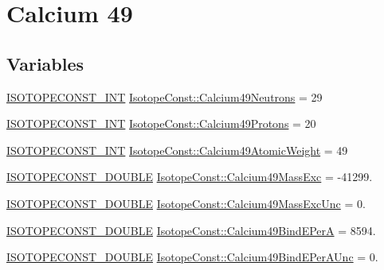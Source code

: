 \hypertarget{group___isotope_const-_calcium-_ca49}{}\section{Calcium 49}
\label{group___isotope_const-_calcium-_ca49}
\subsection*{Variables}
\begin{DoxyCompactItemize}
\item 
\mbox{\hyperlink{group___isotope_const-_macros_ga5f18360b3e99483a35c32d789e62621c}{I\+S\+O\+T\+O\+P\+E\+C\+O\+N\+S\+T\+\_\+\+I\+NT}} \mbox{\hyperlink{group___isotope_const-_calcium-_ca49_ga1460ac1f0fcb5cb558f46b4c9f1b8f87}{Isotope\+Const\+::\+Calcium49\+Neutrons}} = 29
\item 
\mbox{\hyperlink{group___isotope_const-_macros_ga5f18360b3e99483a35c32d789e62621c}{I\+S\+O\+T\+O\+P\+E\+C\+O\+N\+S\+T\+\_\+\+I\+NT}} \mbox{\hyperlink{group___isotope_const-_calcium-_ca49_gacabbec065ac66148f8aea344dbf8311b}{Isotope\+Const\+::\+Calcium49\+Protons}} = 20
\item 
\mbox{\hyperlink{group___isotope_const-_macros_ga5f18360b3e99483a35c32d789e62621c}{I\+S\+O\+T\+O\+P\+E\+C\+O\+N\+S\+T\+\_\+\+I\+NT}} \mbox{\hyperlink{group___isotope_const-_calcium-_ca49_gadb551dc804acf3b73c1dd6917e12c258}{Isotope\+Const\+::\+Calcium49\+Atomic\+Weight}} = 49
\item 
\mbox{\hyperlink{group___isotope_const-_macros_ga8f45a7272ce02c0b4c65c44636ed719a}{I\+S\+O\+T\+O\+P\+E\+C\+O\+N\+S\+T\+\_\+\+D\+O\+U\+B\+LE}} \mbox{\hyperlink{group___isotope_const-_calcium-_ca49_gac6f33ffee9a0ea4d837d079af5b2c681}{Isotope\+Const\+::\+Calcium49\+Mass\+Exc}} = -\/41299.
\item 
\mbox{\hyperlink{group___isotope_const-_macros_ga8f45a7272ce02c0b4c65c44636ed719a}{I\+S\+O\+T\+O\+P\+E\+C\+O\+N\+S\+T\+\_\+\+D\+O\+U\+B\+LE}} \mbox{\hyperlink{group___isotope_const-_calcium-_ca49_ga5c7730e934c7930a86443cda814409ca}{Isotope\+Const\+::\+Calcium49\+Mass\+Exc\+Unc}} = 0.
\item 
\mbox{\hyperlink{group___isotope_const-_macros_ga8f45a7272ce02c0b4c65c44636ed719a}{I\+S\+O\+T\+O\+P\+E\+C\+O\+N\+S\+T\+\_\+\+D\+O\+U\+B\+LE}} \mbox{\hyperlink{group___isotope_const-_calcium-_ca49_ga15442ccaa0f0121c7ca07ca22eda94ec}{Isotope\+Const\+::\+Calcium49\+Bind\+E\+PerA}} = 8594.
\item 
\mbox{\hyperlink{group___isotope_const-_macros_ga8f45a7272ce02c0b4c65c44636ed719a}{I\+S\+O\+T\+O\+P\+E\+C\+O\+N\+S\+T\+\_\+\+D\+O\+U\+B\+LE}} \mbox{\hyperlink{group___isotope_const-_calcium-_ca49_ga24fd463775a0200e45bd1c6402b0afa5}{Isotope\+Const\+::\+Calcium49\+Bind\+E\+Per\+A\+Unc}} = 0.

\end{DoxyCompactItemize}

